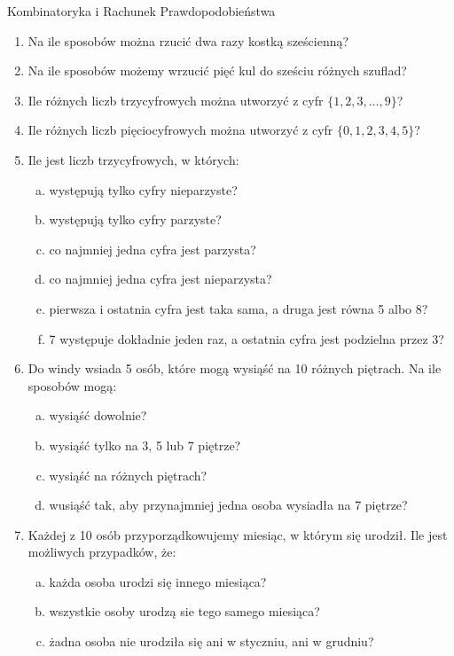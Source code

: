 \documentclass[12pt,a4paper]{article}
\begin{document}
	\begin{center}
		\LARGE Kombinatoryka i Rachunek Prawdopodobieństwa
	\end{center}
	\vspace{1cm}
	\begin{enumerate}[1.]
	\item Na ile sposobów można rzucić dwa razy kostką sześcienną?
	\item Na ile sposobów możemy wrzucić pięć kul do sześciu różnych szuflad?
	\item Ile różnych liczb trzycyfrowych można utworzyć z cyfr $\{1,2,3,\dots,9\}$?
	\item Ile różnych liczb pięciocyfrowych można utworzyć z cyfr $\{0,1,2,3,4,5\}$?
		\item Ile jest liczb trzycyfrowych, w których:
	\begin{enumerate}[a)]
		\item występują tylko cyfry nieparzyste?
		\item występują tylko cyfry parzyste?
		\item co najmniej jedna cyfra jest parzysta?
		\item co najmniej jedna cyfra jest nieparzysta?
		\item pierwsza i ostatnia cyfra jest taka sama, a druga jest równa 5 albo 8?
		\item 7 występuje dokładnie jeden raz, a ostatnia cyfra jest podzielna przez 3?
	\end{enumerate}
	\item Do windy wsiada 5 osób, które mogą wysiąść na 10 różnych piętrach. Na ile sposobów mogą:
	\begin{enumerate}[a)]
		\item wysiąść dowolnie?
		\item wysiąść tylko na 3, 5 lub 7 piętrze?
		\item wysiąść na różnych piętrach?
		\item wusiąść tak, aby przynajmniej jedna osoba wysiadła na 7 piętrze?
	\end{enumerate}
	\item Każdej z 10 osób przyporządkowujemy miesiąc, w którym się urodził. Ile jest możliwych przypadków, że:
	\begin{enumerate}[a)]
		\item każda osoba urodzi się innego miesiąca?
		\item wszystkie osoby urodzą sie tego samego miesiąca?
		\item żadna osoba nie urodziła się ani w styczniu, ani w grudniu?

\end{enumerate}
\end{enumerate}
\end{document}
